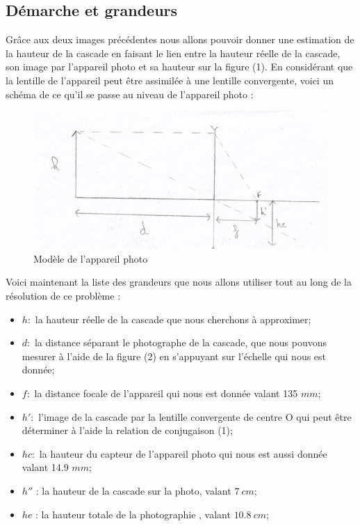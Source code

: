 \documentclass[12pt,a4paper]{article}
\begin{document}
\subsection{Démarche et grandeurs}
Grâce aux deux images précédentes nous allons pouvoir donner une estimation de la hauteur de la cascade en faisant le lien entre la hauteur réelle de la cascade, son image par l'appareil photo et sa hauteur sur la figure (1).
En considérant que la lentille de l'appareil peut être assimilée à une lentille convergente, voici un schéma de ce qu'il se passe au niveau de l'appareil photo :
\begin{figure}[!ht]
\begin{center}
\includegraphics[scale=0.6]{Figures/schéma1.jpg}   
\caption{Modèle de l'appareil photo}
\end{center}
\end{figure}

Voici maintenant la liste des grandeurs que nous allons utiliser tout au long de la résolution de ce problème :\\
\begin{itemize}
\item $h :$ la hauteur réelle de la cascade que nous cherchons à approximer;
\item $d :$ la distance séparant le photographe de la cascade, que nous pouvons mesurer à l'aide de la figure (2) en s'appuyant sur l'échelle qui nous est donnée;
\item $f :$ la distance focale de l'appareil qui nous est donnée valant 135 $mm$;
\item $h' :$ l'image de la cascade par la lentille convergente de centre O qui peut être déterminer à l'aide la relation de conjugaison (1);
\item $hc :$ la hauteur du capteur de l'appareil photo qui nous est aussi donnée valant 14.9 $mm$;
\item $h''$ : la hauteur de la cascade sur la photo, valant $7~cm$;
\item $he$ : la hauteur totale de la photographie , valant $10.8~cm$;
\end{itemize}
\end{document}
